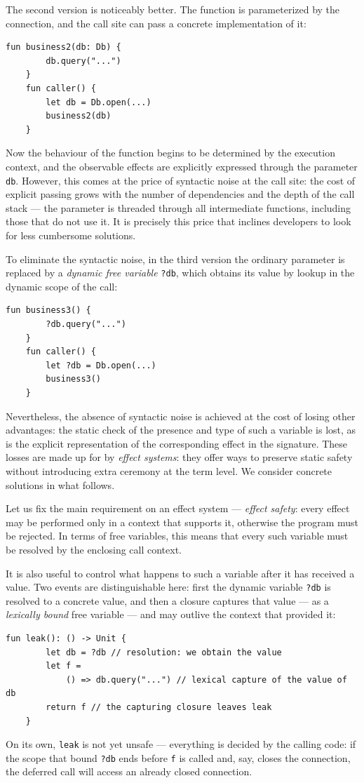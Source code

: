 \documentclass[11pt]{article}
\begin{document}
The second version is noticeably better. The function is parameterized by the connection,
and the call site can pass a concrete implementation of it:
\begin{lstlisting}[language=colang]
    fun business2(db: Db) {
        db.query("...")
    }
    fun caller() {
        let db = Db.open(...)
        business2(db)
    }
\end{lstlisting}
Now the behaviour of the function begins to be determined by the execution context, and
the observable effects are explicitly expressed through the parameter \lstinline|db|.
However, this comes at the price of syntactic noise at the call site: the cost of explicit
passing grows with the number of dependencies and the depth of the call stack --- the
parameter is threaded through all intermediate functions, including those that do not use
it. It is precisely this price that inclines developers to look for less cumbersome
solutions.

To eliminate the syntactic noise, in the third version the ordinary parameter is replaced
by a \emph{dynamic free variable} \lstinline|?db|, which obtains its value by lookup in
the dynamic scope of the call:
\begin{lstlisting}[language=colang]
    fun business3() {
        ?db.query("...")
    }
    fun caller() {
        let ?db = Db.open(...)
        business3()
    }
\end{lstlisting}

Nevertheless, the absence of syntactic noise is achieved at the cost of losing other
advantages: the static check of the presence and type of such a variable is lost, as is
the explicit representation of the corresponding effect in the signature.
These losses are made up for by \emph{effect systems}: they offer ways to preserve static
safety without introducing extra ceremony at the term level.
We consider concrete solutions in what follows.

Let us fix the main requirement on an effect system --- \emph{effect safety}: every
effect may be performed only in a context that supports it, otherwise the program must be
rejected. In terms of free variables, this means that every such variable must be
resolved by the enclosing call context.

It is also useful to control what happens to such a variable after it has received a
value. Two events are distinguishable here: first the dynamic variable \lstinline|?db|
is resolved to a concrete value, and then a closure captures that value ---
as a \emph{lexically bound} free variable --- and may outlive the context that
provided it:
\begin{lstlisting}[language=colang]
    fun leak(): () -> Unit {
        let db = ?db // resolution: we obtain the value
        let f =
            () => db.query("...") // lexical capture of the value of db
        return f // the capturing closure leaves leak
    }
\end{lstlisting}
On its own, \lstinline|leak| is not yet unsafe --- everything is decided by the calling code:
if the scope that bound \lstinline|?db| ends before \lstinline|f| is called and, say,
closes the connection, the deferred call will access an already closed connection.
\end{document}
